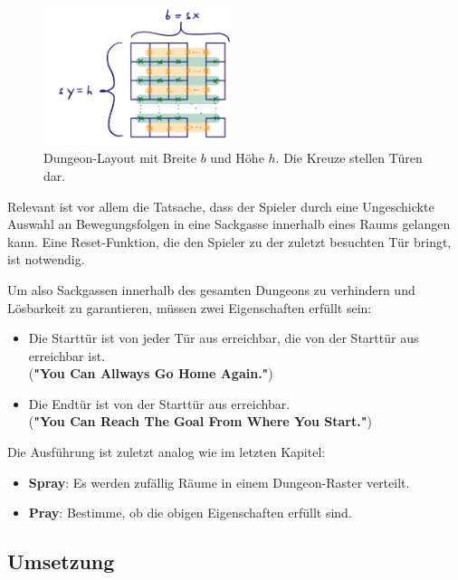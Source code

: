 \documentclass[a4paper,10pt,ngerman]{scrartcl}
\begin{document}
			\begin{figure}[h!]
				\begin{center}
					\includegraphics[width=0.5\textwidth]{tueren.png}
					\caption{Dungeon-Layout mit Breite \(b\) und Höhe \(h\). Die Kreuze stellen Türen dar.}
				\end{center}
			\end{figure}
			
			Relevant ist vor allem die Tatsache, dass der Spieler durch eine Ungeschickte Auswahl an Bewegungsfolgen in eine Sackgasse innerhalb eines Raums gelangen kann. Eine Reset-Funktion, die den Spieler zu der zuletzt besuchten Tür bringt, ist notwendig.
			
			Um also Sackgassen innerhalb des gesamten Dungeons zu verhindern und Lösbarkeit zu garantieren, müssen zwei Eigenschaften erfüllt sein:
			
			\begin{itemize}
				\item Die Starttür ist von jeder Tür aus erreichbar, die von der Starttür aus erreichbar ist. \\ (\textbf{"You Can Allways Go Home Again."})
				\item Die Endtür ist von der Starttür aus erreichbar. \\ (\textbf{"You Can Reach The Goal From Where You Start."})
			\end{itemize}
			
			Die Ausführung ist zuletzt analog wie im letzten Kapitel:
			
			\begin{itemize}
				\item \textbf{Spray}: Es werden zufällig Räume in einem Dungeon-Raster verteilt.
				\item \textbf{Pray}: Bestimme, ob die obigen Eigenschaften erfüllt sind.
			\end{itemize}
		
		\subsection{Umsetzung}
		
\end{document}
